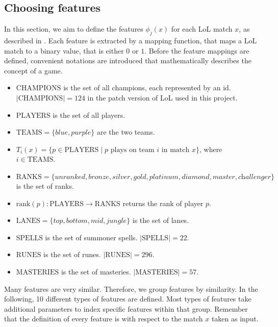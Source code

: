 \subsection{Choosing features}\label{sec:choosingfeatures}
In this section, we aim to define the features $\phi_j(x)$ for each LoL match $x$, as described in .
Each feature is extracted by a mapping function, that maps a LoL match to a binary value, that is either $0$ or $1$.
Before the feature mappings are defined, convenient notations are introduced that mathematically describes the concept of a game.
\begin{itemize}

\item $\text{CHAMPIONS}$ is the set of all champions, each represented by an id. $|\text{CHAMPIONS}| = 124$ in the patch version of LoL used in this project.
\item $\text{PLAYERS}$ is the set of all players.
\item $\text{TEAMS} = \{\textit{blue}, \textit{purple}\}$ are the two teams.
\item $T_i(x) = \{ p \in \text{PLAYERS} \mid p \text{ plays on team } i \text{ in match } x \}$, where $i \in \text{TEAMS}$.
\item $\text{RANKS} = \{\textit{unranked},\textit{bronze},\textit{silver},\textit{gold},\textit{platinum},\textit{diamond},\textit{master},\textit{challenger}\}$ is the set of ranks.
\item $\text{rank}(p) : \text{PLAYERS} \rightarrow \text{RANKS}$ returns the rank of player $p$.
\item $\text{LANES} = \{\textit{top},\textit{bottom},\textit{mid},\textit{jungle}\}$ is the set of lanes.
\item $\text{SPELLS}$ is the set of summoner spells. $|\text{SPELLS}| = 22$.
\item $\text{RUNES}$ is the set of runes. $|\text{RUNES}| = 296$.
\item $\text{MASTERIES}$ is the set of masteries. $|\text{MASTERIES}| = 57$.
\end{itemize}

Many features are very similar. Therefore, we group features by similarity.
In the following, 10 different types of features are defined. Most types of features take additional parameters to index specific features within that group.
Remember that the definition of every feature is with respect to the match $x$ taken as input.

